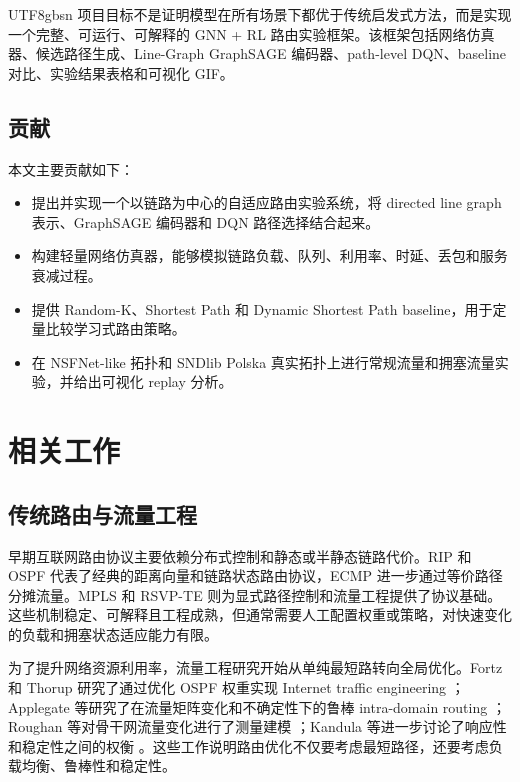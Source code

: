 \documentclass[9pt,a4paper,twocolumn,twoside]{rho-class/rho}
\begin{document}
\begin{CJK*}{UTF8}{gbsn}
项目目标不是证明模型在所有场景下都优于传统启发式方法，而是实现一个完整、可运行、可解释的 GNN + RL 路由实验框架。该框架包括网络仿真器、候选路径生成、Line-Graph GraphSAGE 编码器、path-level DQN、baseline 对比、实验结果表格和可视化 GIF。

\subsection*{贡献}

本文主要贡献如下：

\begin{itemize}
    \item 提出并实现一个以链路为中心的自适应路由实验系统，将 directed line graph 表示、GraphSAGE 编码器和 DQN 路径选择结合起来。
    \item 构建轻量网络仿真器，能够模拟链路负载、队列、利用率、时延、丢包和服务衰减过程。
    \item 提供 Random-K、Shortest Path 和 Dynamic Shortest Path baseline，用于定量比较学习式路由策略。
    \item 在 NSFNet-like 拓扑和 SNDlib Polska 真实拓扑上进行常规流量和拥塞流量实验，并给出可视化 replay 分析。
\end{itemize}

\section{相关工作}

\subsection{传统路由与流量工程}

早期互联网路由协议主要依赖分布式控制和静态或半静态链路代价。RIP \cite{hedrick1988rip} 和 OSPF \cite{moy1998ospf} 代表了经典的距离向量和链路状态路由协议，ECMP \cite{hopps2000ecmp} 进一步通过等价路径分摊流量。MPLS \cite{rosen2001mpls} 和 RSVP-TE \cite{awduche2001rsvp} 则为显式路径控制和流量工程提供了协议基础。这些机制稳定、可解释且工程成熟，但通常需要人工配置权重或策略，对快速变化的负载和拥塞状态适应能力有限。

为了提升网络资源利用率，流量工程研究开始从单纯最短路转向全局优化。Fortz 和 Thorup 研究了通过优化 OSPF 权重实现 Internet traffic engineering \cite{fortz2000internet,fortz2002traffic}；Applegate 等研究了在流量矩阵变化和不确定性下的鲁棒 intra-domain routing \cite{appelgate2003making}；Roughan 等对骨干网流量变化进行了测量建模 \cite{roughan2002experience}；Kandula 等进一步讨论了响应性和稳定性之间的权衡 \cite{kandula2005walking}。这些工作说明路由优化不仅要考虑最短路径，还要考虑负载均衡、鲁棒性和稳定性。


\end{CJK*}
\end{document}
